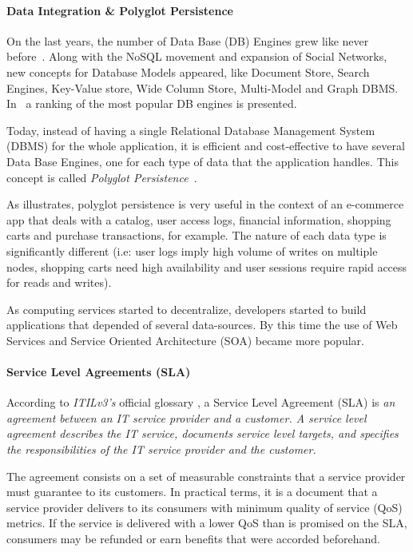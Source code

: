 \documentclass{article}
\begin{document}
\paragraph*{Data Integration \& Polyglot Persistence}
On the last years, the number of Data Base (DB) Engines grew like never before~\cite{dbranking}. 
Along with the NoSQL movement and expansion of Social Networks, new concepts for Database Models appeared, like Document Store, Search Engines, Key-Value store, Wide Column Store, Multi-Model and Graph DBMS. 
In~\cite{dbranking} a ranking of the most popular DB engines is presented.

Today, instead of having a single Relational Database Management System (DBMS) for the whole application, it is efficient and cost-effective to have several Data Base Engines, one for each type of data that the application handles. 
This concept is called \textit{Polyglot Persistence}~\cite{sadalage2012nosql}.


As \cite{AdressingDataManagementCloud} illustrates, polyglot persistence is very useful in the context of an e-commerce app that deals with a catalog, user access logs, financial information, shopping carts and purchase transactions, for example. The nature of each data type is significantly different (i.e: user logs imply high volume of writes on multiple nodes, shopping carts need high availability and user sessions require rapid access for reads and writes). 

As computing services started to decentralize, developers started to build applications that depended of several data-sources. 
By this time the use of Web Services and Service Oriented Architecture (SOA) became more popular. 


\paragraph*{Service Level Agreements (SLA)}
According to \textit{ITILv3's} official glossary \cite{itilv3glossary}, a Service Level Agreement (SLA) is \textit{an agreement between an IT service provider and a customer. A service level agreement describes the IT service, documents service level targets, and specifies the responsibilities of the IT service provider and the customer.} 

The agreement consists on a set of measurable constraints that a service provider must guarantee to its customers.
In practical terms, it is a document that a service provider delivers to its consumers with minimum quality of service (QoS) metrics. If the service is delivered with a lower QoS than is promised on the SLA, consumers may be refunded or earn benefits that were accorded beforehand.    
\end{document}
